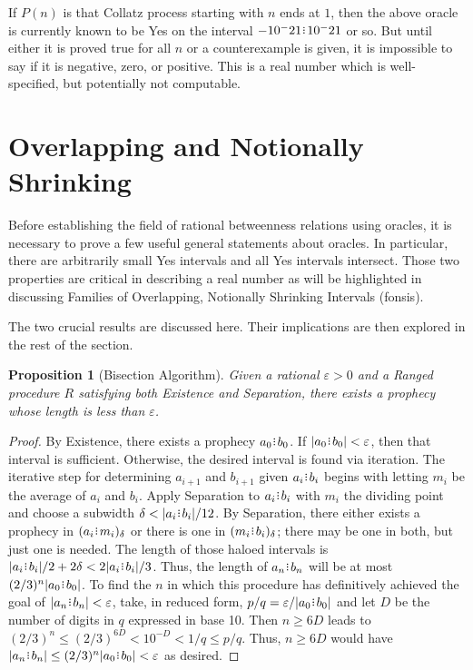 \documentclass[12pt]{article}
\newtheorem{proposition}{Proposition}[section]
\begin{document}
If $P(n)$ is that Collatz process starting with $n$ ends at $1$, then the above oracle is currently known to be Yes on the interval $-10^-21\rint 10^-21$ or so. But until either it is proved true for all $n$ or a counterexample is given, it is impossible to say if it is negative, zero, or positive. This is a real number which is well-specified, but potentially not computable. 


\section{Overlapping and Notionally Shrinking}

Before establishing the field of rational betweenness relations using oracles, it is necessary to prove a few useful general statements about oracles. In particular, there are arbitrarily small Yes intervals and all Yes intervals intersect. Those two properties are critical in describing a real number as will be highlighted in discussing Families of Overlapping, Notionally Shrinking Intervals (fonsis). 

The two crucial results are discussed here. Their implications are then explored in the rest of the section. 

\begin{proposition}[Bisection Algorithm]
    Given a rational $\varepsilon >0$ and a Ranged procedure $R$ satisfying both Existence and Separation, there exists a prophecy whose length is less than $\varepsilon$.
\end{proposition}

\begin{proof}
    By Existence, there exists a prophecy $a_0\rint b_0$. If $|a_0\rint b_0| < \varepsilon$, then that interval is sufficient. Otherwise, the desired interval is found via iteration. The iterative step for determining $a_{i+1}$ and $b_{i+1}$ given $a_i\rint b_i$ begins with letting $m_i$ be the average of $a_i$ and $b_i$. Apply Separation to $a_i\rint b_i$ with $m_i$ the dividing point and choose a subwidth $\delta < |a_i\rint b_i|/12$. By Separation, there either exists a prophecy in $\halo{a_i\rint m_i}$ or there is one in $\halo{m_i\rint b_i}$; there may be one in both, but just one is needed. The length of those haloed intervals is $|a_i \rint  b_i|/2 + 2 \delta < 2 |a_i\rint b_i| /3$. Thus, the length of $a_n\rint b_n$ will be at most $(2/3)^n |a_0\rint b_0|$. To find the $n$ in which this procedure has definitively achieved the goal of $|a_n\rint b_n|<\varepsilon$,  take, in reduced form, $p/q = \varepsilon/|a_0\rint b_0|$ and let $D$ be the number of digits in $q$ expressed in base 10. Then $n \geq  6D$ leads to  $(2/3)^n \leq (2/3)^{6D} < 10^{-D} < 1/q \leq p/q$. Thus, $n \geq 6D$ would have $|a_n\rint b_n| \leq (2/3)^n |a_0\rint b_0| < \varepsilon$ as desired. 
\end{proof}
\end{document}
